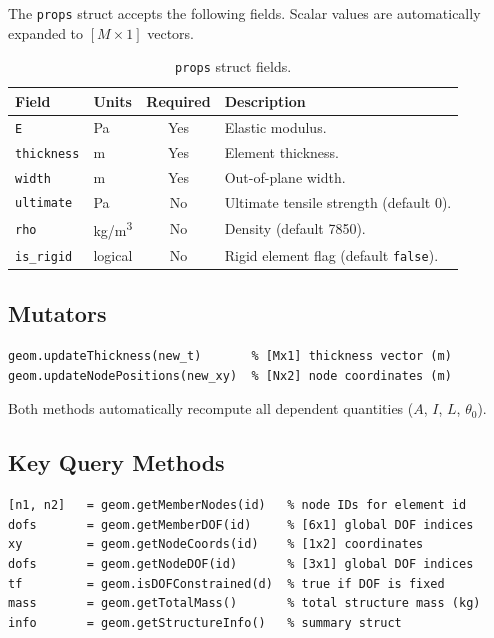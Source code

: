 The \texttt{props} struct accepts the following fields.  Scalar values are
automatically expanded to $[M\times1]$ vectors.

\begin{table}[H]
\centering
\caption{\texttt{props} struct fields.}
\begin{tabularx}{\textwidth}{llcX}
\toprule
\textbf{Field} & \textbf{Units} & \textbf{Required} & \textbf{Description} \\
\midrule
\texttt{E}         & Pa       & Yes & Elastic modulus. \\
\texttt{thickness} & m        & Yes & Element thickness. \\
\texttt{width}     & m        & Yes & Out-of-plane width. \\
\texttt{ultimate}  & Pa       & No  & Ultimate tensile strength (default 0). \\
\texttt{rho}       & kg/m\textsuperscript{3} & No  & Density (default 7850). \\
\texttt{is\_rigid} & logical  & No  & Rigid element flag (default \texttt{false}). \\
\bottomrule
\end{tabularx}
\end{table}

\subsection{Mutators}

\begin{lstlisting}
geom.updateThickness(new_t)       % [Mx1] thickness vector (m)
geom.updateNodePositions(new_xy)  % [Nx2] node coordinates (m)
\end{lstlisting}

Both methods automatically recompute all dependent quantities ($A$, $I$, $L$,
$\theta_0$).

\subsection{Key Query Methods}

\begin{lstlisting}
[n1, n2]   = geom.getMemberNodes(id)   % node IDs for element id
dofs       = geom.getMemberDOF(id)     % [6x1] global DOF indices
xy         = geom.getNodeCoords(id)    % [1x2] coordinates
dofs       = geom.getNodeDOF(id)       % [3x1] global DOF indices
tf         = geom.isDOFConstrained(d)  % true if DOF is fixed
mass       = geom.getTotalMass()       % total structure mass (kg)
info       = geom.getStructureInfo()   % summary struct
\end{lstlisting}

